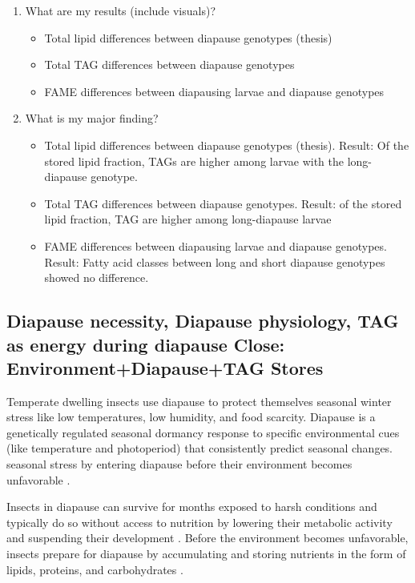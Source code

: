 \documentclass[review]{elsarticle}
\begin{document}
\begin{enumerate}
\item What are my results (include visuals)?
\begin{itemize}
\item Total lipid differences between diapause genotypes (thesis)
\item Total TAG differences between diapause genotypes
\item FAME differences between diapausing larvae and diapause genotypes
\end{itemize}

\item What is my major finding?
\begin{itemize}
\item Total lipid differences between diapause genotypes (thesis). Result: Of the stored lipid fraction, TAGs are higher among larvae with the long-diapause genotype.
\item Total TAG differences between diapause genotypes. Result: of the stored lipid fraction, TAG are higher among long-diapause larvae
\item FAME differences between diapausing larvae and diapause genotypes. Result: Fatty acid classes between long and short diapause genotypes showed no difference.
\end{itemize}
\end{enumerate}


\subsection{Diapause necessity, Diapause physiology, TAG as energy during diapause Close: Environment+Diapause+TAG Stores}

Temperate dwelling insects use diapause to protect themselves seasonal winter stress like low temperatures, low humidity, and food scarcity. Diapause is a genetically regulated seasonal dormancy response to specific environmental cues (like temperature and photoperiod) that consistently predict seasonal changes.  seasonal stress by entering diapause before their environment becomes unfavorable \citep{Kostal2006}. 

Insects in diapause can survive for months exposed to harsh conditions and typically do so without access to nutrition by lowering their metabolic activity and suspending their development \citep{Nechols1999,Hahn2007}. Before the environment becomes unfavorable, insects prepare for diapause by accumulating and storing nutrients in the form of lipids, proteins, and carbohydrates \citep{Hahn2011,Hahn2007}.
\end{document}

